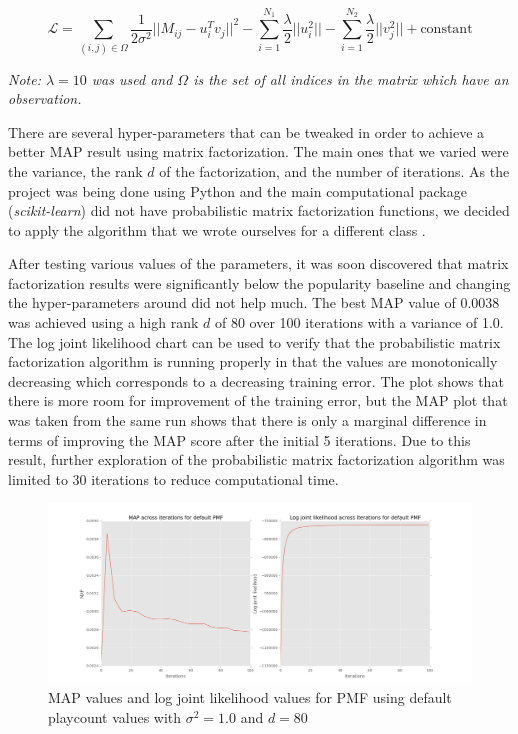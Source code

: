 \documentclass[11pt,preprint]{aastex}
\newcommand{\TRANSPOSE}{\ensuremath{T}}
\begin{document}
\begin{equation}
\mathcal{L} = \sum_{(i,j) \in \Omega} \frac{1}{2\sigma^2} {|| M_{ij} - u_i^\TRANSPOSE  v_j||}^2 - \sum_{i=1}^{N_1} \frac{\lambda}{2} ||u_i^2 || - \sum_{i=1}^{N_2} \frac{\lambda}{2} ||v_j^2 || + \text{constant}
\label{eq3} 
\end{equation}

\emph{Note: $\lambda = 10$ was used and $\Omega$ is the set of all indices in the matrix which have an observation.}

There are several hyper-parameters that can be tweaked in order to achieve a better MAP result using matrix factorization. The main ones that we varied were the variance, the rank $d$ of the factorization, and the number of iterations. As the project was being done using Python and the main computational package (\emph{scikit-learn}) did not have probabilistic matrix factorization functions, we decided to apply the algorithm that we wrote ourselves for a different class \citep{koren2009matrix}. 
 
After testing various values of the parameters, it was soon discovered that matrix factorization results were significantly below the popularity baseline and changing the hyper-parameters around did not help much. The best MAP value of 0.0038 was achieved using a high rank $d$ of 80 over 100 iterations with a variance of 1.0. The log joint likelihood chart can be used to verify that the probabilistic matrix factorization algorithm is running properly in that the values are monotonically decreasing which corresponds to a decreasing training error. The plot shows that there is more room for improvement of the training error, but the MAP plot that was taken from the same run shows that there is only a marginal difference in terms of improving the MAP score after the initial 5 iterations. Due to this result, further exploration of the probabilistic matrix factorization algorithm was limited to 30 iterations to reduce computational time. 

\begin{figure}[htbp] %
   \centering
   \includegraphics[width=6in]{../plots/final/defaultPMF.png} 
   \caption{MAP values and log joint likelihood values for PMF using default playcount values with $\sigma^2 = 1.0$ and $d = 80$}
   \label{defaultPMF}
\end{figure}
 
\end{document}
